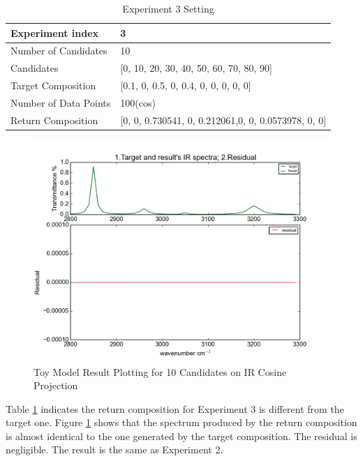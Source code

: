 \begin{table} \label{tab:3.2}
\begin{center}
\begin{tabular}{| l | p{7cm} | }
\hline
Experiment index & 3  \\
\hline
Number of Candidates & 10   \\
\hline
Candidates & [0, 10, 20, 30, 40, 50, 60, 70, 80, 90]  \\
\hline
Target Composition & [0.1, 0, 0.5, 0, 0.4, 0, 0, 0, 0, 0] \\
\hline
Number of Data Points & 100(cos) \\
\hline
Return Composition & [0, 0, 0.730541, 0, 0.212061,0, 0, 0.0573978, 0, 0] \\
\hline
\end{tabular}
\end{center}
\caption{Experiment 3 Setting}
\end{table}	

\begin{figure}[!ht] \label{fig:3.3}
\centering
\includegraphics[scale=0.7]{Figures/toy_model_result_plotting_ir_cos_10candi_1.png} 
\caption{Toy Model Result Plotting for 10 Candidates on IR Cosine Projection}
\end{figure}

Table \ref{tab:3.2} indicates the return composition for Experiment 3 is different from the target one. Figure \ref{fig:3.3} shows that the spectrum produced by the return composition is almost identical to the one generated by the target composition. The residual is negligible. The result is the same as Experiment 2. \\

